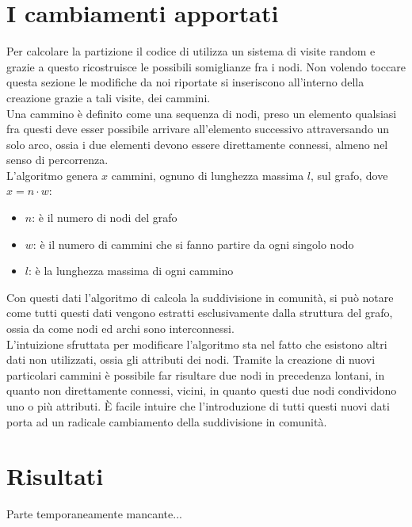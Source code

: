 \section{I cambiamenti apportati}
Per calcolare la partizione il codice di \cnrl utilizza un sistema di visite random e grazie a questo ricostruisce le possibili somiglianze fra i nodi. Non volendo toccare questa sezione le modifiche da noi riportate si inseriscono all'interno della creazione grazie a tali visite, dei cammini.\\
Una cammino è definito come una sequenza di nodi, preso un elemento qualsiasi fra questi deve esser possibile arrivare all'elemento successivo attraversando un solo arco, ossia i due elementi devono essere direttamente connessi, almeno nel senso di percorrenza.\\
L'algoritmo genera $x$ cammini, ognuno di lunghezza massima $l$, sul grafo, dove $x=n \cdot w$:
\begin{itemize}
	\item $n$: è il numero di nodi del grafo
	\item $w$: è il numero di cammini che si fanno partire da ogni singolo nodo
	\item $l$: è la lunghezza massima di ogni cammino
\end{itemize}
%
Con questi dati l'algoritmo di \cnrl calcola la suddivisione in comunità, si può notare come tutti questi dati vengono estratti esclusivamente dalla struttura del grafo, ossia da come nodi ed archi sono interconnessi.\\
L'intuizione sfruttata per modificare l'algoritmo sta nel fatto che esistono altri dati non utilizzati, ossia gli attributi dei nodi. Tramite la creazione di nuovi particolari cammini è possibile far risultare due nodi in precedenza lontani, in quanto non direttamente connessi, vicini, in quanto questi due nodi condividono uno o più attributi. È facile intuire che l'introduzione di tutti questi nuovi dati porta ad un radicale cambiamento della suddivisione in comunità.
%
\section{Risultati}
Parte temporaneamente mancante...

%
%
%
%
\newpage
%
